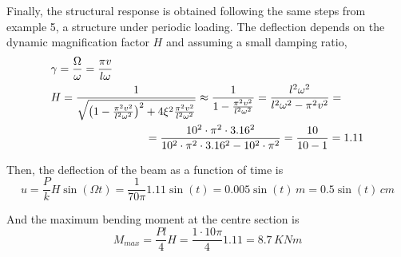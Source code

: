 \documentclass{problems}
\begin{document}
Finally, the structural response is obtained following the same steps from example 5, a structure under periodic loading. The deflection depends on the dynamic magnification factor $H$ and assuming a small damping ratio,
\begin{align*}
&\gamma = \frac{\Omega}{\omega} = \frac{\pi v}{l\omega} \\
&H = \frac{1}{\sqrt{\left(1-\frac{\pi^2v^2}{l^2\omega^2}\right)^2 + 4\xi^2\frac{\pi^2v^2}{l^2\omega^2}}} \approx \frac{1}{1-\frac{\pi^2v^2}{l^2\omega^2}} = \frac{l^2\omega^2}{l^2\omega^2-\pi^2v^2} = \qquad \\
&\pushright{= \frac{10^2\cdot\pi^2\cdot 3.16^2}{10^2\cdot\pi^2\cdot 3.16^2 - 10^2\cdot\pi^2}
= \frac{10}{10-1} = 1.11}
\end{align*}

Then, the deflection of the beam as a function of time is
$$
u = \frac{P}{k}H\sin(\Omega t) = \frac{1}{70\pi}1.11\sin(t) = 0.005\sin(t)\,m = 0.5\sin(t)\,cm
$$

And the maximum bending moment at the centre section is
$$
M_{max} = \frac{Pl}{4}H = \frac{1 \cdot 10\pi}{4}1.11 = 8.7\,KNm
$$
\end{document}
